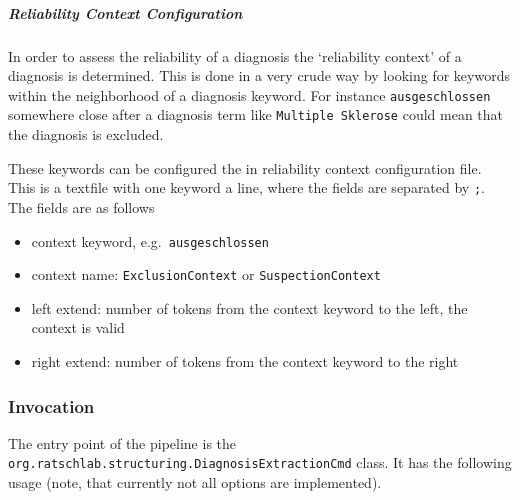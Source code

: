 \subparagraph{Reliability Context
Configuration}\label{reliability-context-configuration}

In order to assess the reliability of a diagnosis the `reliability
context' of a diagnosis is determined. This is done in a very crude way
by looking for keywords within the neighborhood of a diagnosis keyword.
For instance \texttt{ausgeschlossen} somewhere close after a diagnosis
term like \texttt{Multiple\ Sklerose} could mean that the diagnosis is
excluded.

These keywords can be configured the in reliability context
configuration file. This is a textfile with one keyword a line, where
the fields are separated by \texttt{;}. The fields are as follows

\begin{itemize}
\tightlist
\item
  context keyword, e.g.~\texttt{ausgeschlossen}
\item
  context name: \texttt{ExclusionContext} or \texttt{SuspectionContext}
\item
  left extend: number of tokens from the context keyword to the left,
  the context is valid
\item
  right extend: number of tokens from the context keyword to the right
\end{itemize}

\subsubsection{Invocation}\label{invocation}

The entry point of the pipeline is the
\texttt{org.ratschlab.structuring.DiagnosisExtractionCmd} class. It has
the following usage (note, that currently not all options are
implemented).

